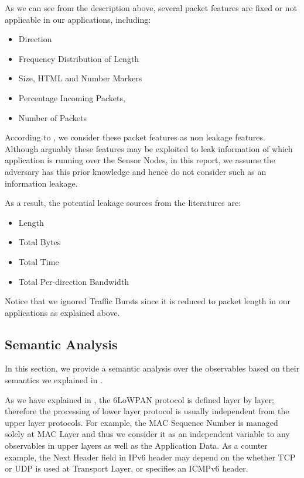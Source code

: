 As we can see from the description above, several packet features are fixed or not applicable in our applications, including:

\begin{itemize} 
	\item Direction
	\item Frequency Distribution of Length
	\item Size, HTML and Number Markers
	\item Percentage Incoming Packets,
	\item Number of Packets
\end{itemize}

According to , we consider these packet features as non leakage features. Although arguably these features may be exploited to leak information of which application is running over the Sensor Nodes, in this report, we assume the adversary has this prior knowledge and hence do not consider such as an information leakage.

As a result, the potential leakage sources from the literatures are:
\begin{itemize}
	\item Length
	\item Total Bytes
	\item Total Time
	\item Total Per-direction Bandwidth
\end{itemize}

Notice that we ignored Traffic Bursts since it is reduced to packet length in our applications as explained above.

\subsection{Semantic Analysis}

In this section, we provide a semantic analysis over the observables based on their semantics we explained in .

As we have explained in , the 6LoWPAN protocol is defined layer by layer; therefore the processing of lower layer protocol is usually independent from the upper layer protocols. For example, the MAC Sequence Number is managed solely at MAC Layer and thus we consider it as an independent variable to any observables in upper layers as well as the Application Data. As a counter example, the Next Header field in IPv6 header may depend on the whether TCP or UDP is used at Transport Layer, or specifies an ICMPv6 header.


